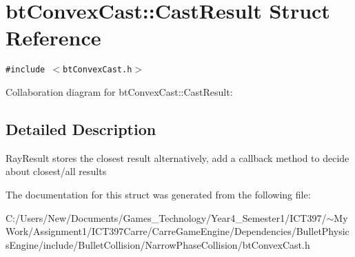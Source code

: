 \hypertarget{structbt_convex_cast_1_1_cast_result}{
\section{btConvexCast::CastResult Struct Reference}
\label{structbt_convex_cast_1_1_cast_result}
}
{\tt \#include $<$btConvexCast.h$>$}

Collaboration diagram for btConvexCast::CastResult:

\subsection{Detailed Description}
RayResult stores the closest result alternatively, add a callback method to decide about closest/all results 

The documentation for this struct was generated from the following file:\begin{CompactItemize}
\item 
C:/Users/New/Documents/Games\_\-Technology/Year4\_\-Semester1/ICT397/$\sim$My Work/Assignment1/ICT397Carre/CarreGameEngine/Dependencies/BulletPhysicsEngine/include/BulletCollision/NarrowPhaseCollision/btConvexCast.h\end{CompactItemize}

